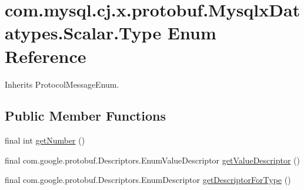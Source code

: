 \hypertarget{enumcom_1_1mysql_1_1cj_1_1x_1_1protobuf_1_1_mysqlx_datatypes_1_1_scalar_1_1_type}{}\section{com.\+mysql.\+cj.\+x.\+protobuf.\+Mysqlx\+Datatypes.\+Scalar.\+Type Enum Reference}
\label{enumcom_1_1mysql_1_1cj_1_1x_1_1protobuf_1_1_mysqlx_datatypes_1_1_scalar_1_1_type}


Inherits Protocol\+Message\+Enum.

\subsection*{Public Member Functions}
\begin{DoxyCompactItemize}
\item 
final int \mbox{\hyperlink{enumcom_1_1mysql_1_1cj_1_1x_1_1protobuf_1_1_mysqlx_datatypes_1_1_scalar_1_1_type_a9ffe04e2f26f9aa66740e34032c6222a}{get\+Number}} ()
\item 
final com.\+google.\+protobuf.\+Descriptors.\+Enum\+Value\+Descriptor \mbox{\hyperlink{enumcom_1_1mysql_1_1cj_1_1x_1_1protobuf_1_1_mysqlx_datatypes_1_1_scalar_1_1_type_a00dfa1b910b67af98206e59eb23fbdc9}{get\+Value\+Descriptor}} ()
\item 
final com.\+google.\+protobuf.\+Descriptors.\+Enum\+Descriptor \mbox{\hyperlink{enumcom_1_1mysql_1_1cj_1_1x_1_1protobuf_1_1_mysqlx_datatypes_1_1_scalar_1_1_type_a2ee294138ece39ebee5ed110bf7a9d81}{get\+Descriptor\+For\+Type}} ()
\end{DoxyCompactItemize}
